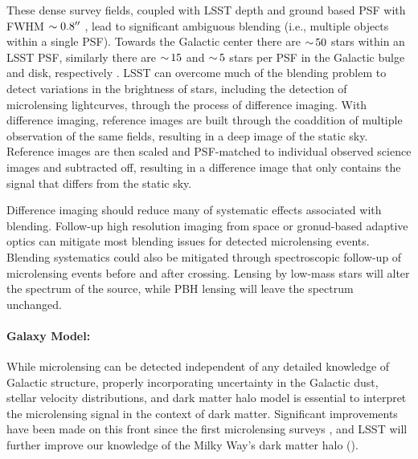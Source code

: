 These dense survey fields, coupled with LSST depth and ground based PSF with FWHM $\sim 0.8 ''$ \citep{0805.2366}, lead to significant ambiguous blending (i.e., multiple objects within a single PSF).
Towards the Galactic center there are $ {\sim}\, 50$ stars within an LSST PSF, similarly there are $ {\sim}\, 15$ and $ {\sim}\, 5$ stars per PSF in the Galactic bulge and disk, respectively \citep{1806.06372}.
LSST can overcome much of the blending problem to detect variations in the brightness of stars, including the detection of microlensing lightcurves, through the process of difference imaging.
With difference imaging, reference images are built through the coaddition of multiple observation of the same fields, resulting in a deep image of the static sky. Reference images are then scaled and PSF-matched to individual observed science images and subtracted off, resulting in a difference image that only contains the signal that differs from the static sky. 

Difference imaging should reduce many of systematic effects associated with blending. Follow-up high resolution imaging from space or gronud-based adaptive optics can mitigate most blending issues for detected microlensing events.
Blending systematics could also be mitigated through spectroscopic follow-up of microlensing events before and after crossing. Lensing by low-mass stars will alter the spectrum of the source, while PBH lensing will leave the spectrum unchanged.

\paragraph{Galaxy Model:} While microlensing can be detected independent of any detailed knowledge of Galactic structure, properly incorporating uncertainty in the Galactic dust, stellar velocity distributions, and dark matter halo model is essential to interpret the microlensing signal in the context of dark matter.
Significant improvements have been made on this front since the first microlensing surveys \citep[e.g.,][]{2018MNRAS.479.2889C}, and LSST will further improve our knowledge of the Milky Way's dark matter halo ().


